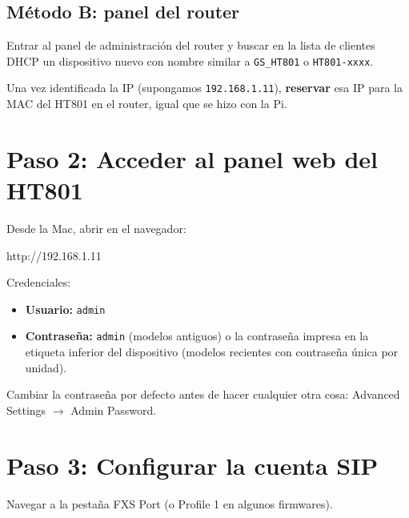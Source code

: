\subsection{Método B: panel del router}

Entrar al panel de administración del router y buscar en la lista de clientes DHCP un dispositivo nuevo con nombre similar a \texttt{GS\_HT801} o \texttt{HT801-xxxx}.

Una vez identificada la IP (supongamos \texttt{192.168.1.11}), \textbf{reservar} esa IP para la MAC del HT801 en el router, igual que se hizo con la Pi.

\section{Paso 2: Acceder al panel web del HT801}

Desde la Mac, abrir en el navegador:

\begin{plaincode}
http://192.168.1.11
\end{plaincode}

Credenciales:

\begin{itemize}
  \item \textbf{Usuario:} \texttt{admin}
  \item \textbf{Contraseña:} \texttt{admin} (modelos antiguos) o la contraseña impresa en la etiqueta inferior del dispositivo (modelos recientes con contraseña única por unidad).
\end{itemize}

\begin{advertencia}
Cambiar la contraseña por defecto antes de hacer cualquier otra cosa: \textsf{Advanced Settings} $\to$ \textsf{Admin Password}.
\end{advertencia}

\section{Paso 3: Configurar la cuenta SIP}

Navegar a la pestaña \textsf{FXS Port} (o \textsf{Profile 1} en algunos firmwares).

